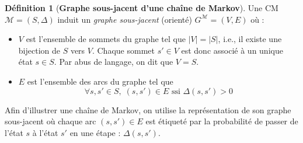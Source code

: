 \documentclass[12pt,a4paper]{report}
\theoremstyle{definition}%
\newtheorem{definition}{Définition}[chapter]
\theoremstyle{remark}
\newcommand{\ssi}{ssi }
\newcommand{\ie}{i.e., }
\let\labelitemi\labelitemii
\begin{document}
\begin{definition}[\textbf{Graphe sous-jacent d'une chaîne de Markov}]
	Une CM $\mathcal{M} = (S, \Delta)$ induit un \textit{graphe sous-jacent} (orienté) $G^\mathcal{M} = (V, E)$ où :
	\begin{itemize}
		\renewcommand{\labelitemi}{\tiny$\bullet$}
		\item $V$ est l'ensemble de sommets du graphe tel que $|V| = |S|$, \ie il existe une bijection de $S$ vers $V$. Chaque sommet $s' \in V$ est donc associé à un unique état $s \in S$. Par abus de langage, on dit que $V = S$.
		\item $E$ est l'ensemble des arcs du graphe tel que \[ \forall s, s' \in S, \; (s, s') \in E \text{ \ssi} \Delta(s, s') > 0\]
	\end{itemize}
\end{definition}

Afin d'illustrer une chaîne de Markov, on utilise la représentation de son graphe sous-jacent où 
chaque arc $(s, s') \in E$ est étiqueté par la probabilité de passer de l'état $s$ à l'état $s'$ en une étape : $\Delta(s, s')$.
\end{document}
